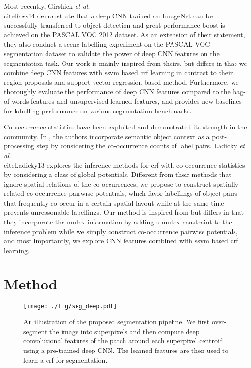 \documentclass[10pt,3p]{elsarticle}
\def\onedot{.\xspace}
\def\etal{\emph{et al}\onedot}
\newcommand{\ssvm}{{\sc ssvm}\xspace}
\newcommand{\crf}{{\sc crf}\xspace}
\begin{document}
Most recently, Girshick \etal \\cite{Ross14} demonstrate that a deep CNN trained on ImageNet can be successfully transferred to object detection and great performance boost is achieved on the PASCAL VOC 2012 dataset. As an extension of their statement, they also conduct a scene labelling experiment on the PASCAL VOC segmentation dataset to validate the power of deep CNN features on the segmentation task.
Our work is mainly inspired from theirs, but differs in that we combine deep CNN features with \ssvm based \crf learning in contrast to their region proposals and support vector regression based method.  Furthermore, we thoroughly evaluate the performance of deep CNN features compared to the bag-of-words features and unsupervised learned features, and provides new baselines for labelling performance on various segmentation benchmarks.
%
%

Co-occurrence statistics have been exploited and demonstrated its strength in the community. In \cite{Rabinovich07}, the authors incorporate semantic object context as a post-processing step by considering the co-occurrence counts of label pairs.
Ladicky \etal \\cite{Ladicky13} explores the inference methods for \crf with co-occurrence statistics by considering a class of global potentials.
Different from their methods that ignore spatial relations of the co-occurrences, we propose to construct spatially related co-occurrence pairwise potentials, which favor labellings of object pairs that frequently co-occur in a certain spatial layout while at the same time prevents unreasonable labellings.
Our method is  inspired from \cite{Roy14} but differs in that they incorporate the mutex information by adding a mutex constraint to the inference problem while we simply construct co-occurrence pairwise potentials, and most importantly, we explore CNN features combined with \ssvm based \crf learning.


\section{Method}
%
%
%
%
%
%
%
%
%
%
%
%
%
%
%
%
%
\begin{figure}[!t]
\centering
    \texttt{[image: ./fig/seg\_deep.pdf]}\\
\caption{An illustration of the proposed segmentation pipeline.
We first over-segment the image into superpixels and then compute deep convolutional features of the patch around each superpixel centroid using a pre-trained deep CNN. The learned features are then used to learn a \crf for segmentation.  }
\label{fig:illu_seg}
\end{figure}
%
%
%
%
%
%
%
%
%
%
%
%
%
%
%
%
%
%
%
%
%
%
%
%
%
%
%
%
%
%
%
%
\end{document}
